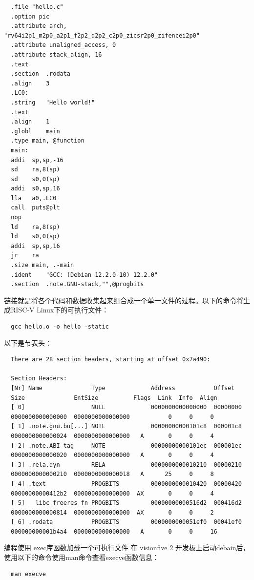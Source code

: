 \documentclass[lang=cn,10pt]{elegantbook}
\begin{document}
\begin{lstlisting}
  .file	"hello.c"
  .option pic
  .attribute arch, "rv64i2p1_m2p0_a2p1_f2p2_d2p2_c2p0_zicsr2p0_zifencei2p0"
  .attribute unaligned_access, 0
  .attribute stack_align, 16
  .text
  .section	.rodata
  .align	3
  .LC0:
  .string	"Hello world!"
  .text
  .align	1
  .globl	main
  .type	main, @function
  main:
  addi	sp,sp,-16
  sd	ra,8(sp)
  sd	s0,0(sp)
  addi	s0,sp,16
  lla	a0,.LC0
  call	puts@plt
  nop
  ld	ra,8(sp)
  ld	s0,0(sp)
  addi	sp,sp,16
  jr	ra
  .size	main, .-main
  .ident	"GCC: (Debian 12.2.0-10) 12.2.0"
  .section	.note.GNU-stack,"",@progbits
\end{lstlisting}
链接就是将各个代码和数据收集起来组合成一个单一文件的过程。以下的命令将生成RISC-V Linux下的可执行文件：

\begin{lstlisting}
  gcc hello.o -o hello -static
\end{lstlisting}
以下是节表头：

\begin{lstlisting}
  There are 28 section headers, starting at offset 0x7a490:

  Section Headers:
  [Nr] Name              Type             Address           Offset
  Size              EntSize          Flags  Link  Info  Align
  [ 0]                   NULL             0000000000000000  00000000
  0000000000000000  0000000000000000           0     0     0
  [ 1] .note.gnu.bu[...] NOTE             00000000000101c8  000001c8
  0000000000000024  0000000000000000   A       0     0     4
  [ 2] .note.ABI-tag     NOTE             00000000000101ec  000001ec
  0000000000000020  0000000000000000   A       0     0     4
  [ 3] .rela.dyn         RELA             0000000000010210  00000210
  0000000000000210  0000000000000018   A      25     0     8
  [ 4] .text             PROGBITS         0000000000010420  00000420
  00000000000412b2  0000000000000000  AX       0     0     4
  [ 5] __libc_freeres_fn PROGBITS         00000000000516d2  000416d2
  0000000000000814  0000000000000000  AX       0     0     2
  [ 6] .rodata           PROGBITS         0000000000051ef0  00041ef0
  000000000001b4a4  0000000000000000   A       0     0     16
\end{lstlisting}

编程使用 exec库函数加载一个可执行文件
在 visionfive 2 开发板上启动debain后，使用以下的命令使用man命令查看execve函数信息：

\begin{lstlisting}
  man execve
\end{lstlisting}
\end{document}
